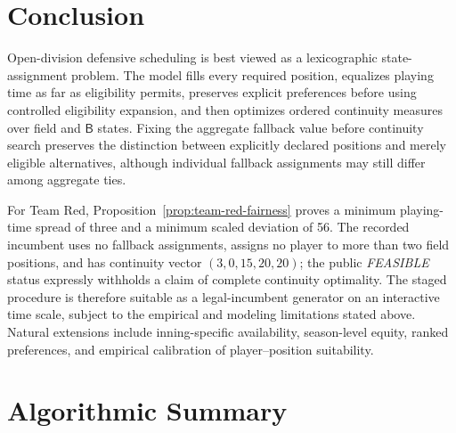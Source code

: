 \documentclass[11pt]{article}
\newcommand{\Bench}{\mathsf{B}}
\begin{document}
\section{Conclusion}

Open-division defensive scheduling is best viewed as a lexicographic state-
assignment problem. The model fills every required position, equalizes playing
time as far as eligibility permits, preserves explicit preferences before
using controlled eligibility expansion, and then optimizes ordered continuity
measures over field and $\Bench$ states. Fixing the aggregate fallback value
before continuity search preserves the distinction between explicitly declared
positions and merely eligible alternatives, although individual fallback
assignments may still differ among aggregate ties.

For Team Red, Proposition~\ref{prop:team-red-fairness} proves a minimum playing-time spread of three and a
minimum scaled deviation of 56. The recorded incumbent uses no fallback
assignments, assigns no player to more than two field positions, and has
continuity vector $(3,0,15,20,20)$; the public \emph{FEASIBLE} status expressly
withholds a claim of complete continuity optimality. The staged procedure is
therefore suitable as a legal-incumbent generator on an interactive time scale,
subject to the empirical and modeling limitations stated above. Natural
extensions include inning-specific availability, season-level equity, ranked
preferences, and empirical calibration of player--position suitability.

\appendix
\section{Algorithmic Summary}
\end{document}
